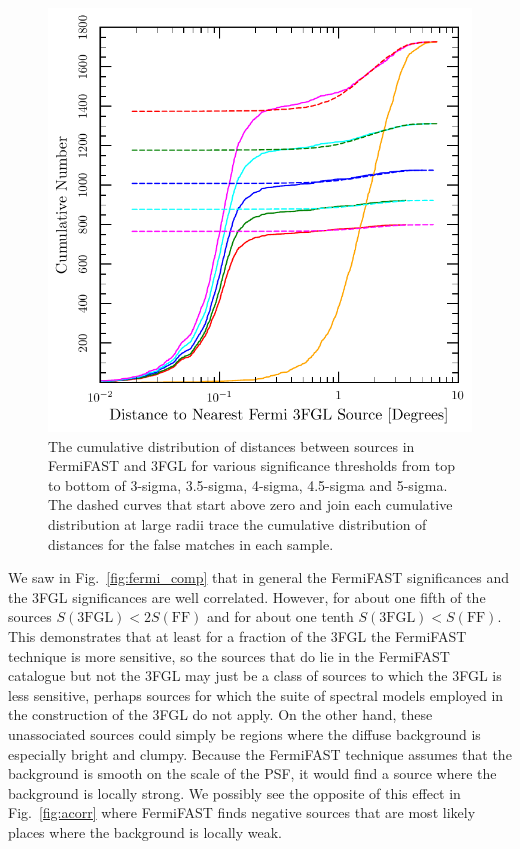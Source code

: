 \documentclass[useAMS,usenatbib]{mn2e}
\begin{document}
\begin{figure}
  \includegraphics[width=\columnwidth]{cumfflo_comp}
  \caption{The cumulative distribution of distances between sources in
    FermiFAST and 3FGL for various significance thresholds from top
    to bottom of 3-sigma, 3.5-sigma, 4-sigma, 4.5-sigma and 5-sigma.
    The dashed curves that start above zero and join each cumulative
    distribution at large radii trace the cumulative distribution of
    distances for the false matches in each sample.}
  \label{fig:ffl_comp}
\end{figure}

We saw in Fig.~\ref{fig:fermi_comp} that in general the FermiFAST
significances and the 3FGL significances are well correlated.
However, for about one fifth of the sources $S(\mathrm{3FGL}) < 2
S(\mathrm{FF})$ and for about one tenth $S(\mathrm{3FGL}) <
S(\mathrm{FF})$.  This demonstrates that at least for a fraction of
the 3FGL the FermiFAST technique is more sensitive, so the sources
that do lie in the FermiFAST catalogue but not the 3FGL may just be a
class of sources to which the 3FGL is less sensitive, perhaps sources
for which the suite of spectral models employed in the construction of
the 3FGL do not apply.  On the other hand, these unassociated sources
could simply be regions where the diffuse background is especially
bright and clumpy.  Because the FermiFAST technique assumes that the
background is smooth on the scale of the PSF, it would find a source
where the background is locally strong.  We possibly see the opposite
of this effect in Fig.~\ref{fig:acorr} where FermiFAST finds negative
sources that are most likely places where the background is locally
weak.
\end{document}
